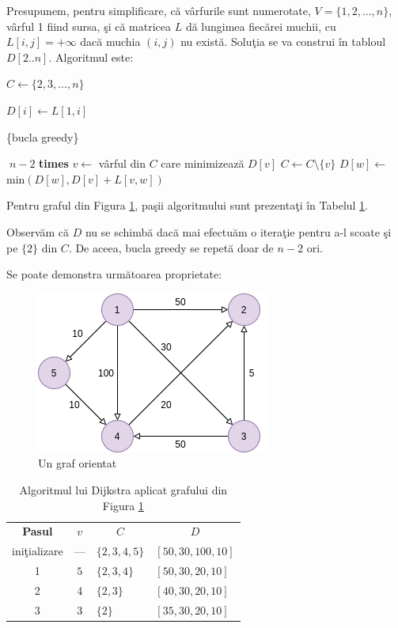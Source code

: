 \documentclass{article}
\begin{document}
Presupunem, pentru simplificare, că vârfurile sunt numerotate, $V=\{1, 2, \ldots, n\}$, vârful 1 fiind sursa, şi că matricea $L$ dă lungimea fiecărei muchii, cu $L[i,j] = +\infty$ dacă muchia $(i, j)$ nu există. Soluţia se va construi în tabloul $D[2 .. n]$. Algoritmul este:

\begin{algorithmic}
	\State {}
	\State $C \gets \{2, 3, \ldots, n\}$ \qquad {}


		\State $D[i] \gets L[1,i]$
	\EndFor

	\State \{bucla greedy\}

	\Repeat $\;n-2$ \textbf{times}
		\State $v \gets$ vârful din $C$ care minimizează $D[v]$
		\State $C \gets C \setminus \{v\}$ \qquad {}
			\State $D[w] \gets$ min$(D[w], D[v] + L[v,w])$
		\EndFor
	\Until{}
	\hspace{-.1cm}
\EndFunction
\end{algorithmic}

Pentru graful din Figura \ref{fig:graf}, paşii algoritmului sunt prezentaţi în Tabelul \ref{tbl:algo}.


Observăm că $D$ nu se schimbă dacă mai efectuăm o iteraţie pentru a-l scoate şi pe $\{2\}$ din $C$. De aceea, bucla greedy se repetă doar de $n-2$ ori.

Se poate demonstra următoarea proprietate:

\begin{figure}[htbp]
	\centering
	\includegraphics[scale=.7]{graf.png}

	\caption{Un graf orientat} \label{fig:graf}
\end{figure}

\begin{table}[htbp]
	\centering
	
	\begin{tabular}{c c l l}
		\textbf{Pasul} & $v$ & \multicolumn{1}{c}{$C$} & \multicolumn{1}{c}{$D$} \tabularnewline
		iniţializare & $—$ & $\{2,3,4,5\}$ & $[50,30,100,10]$\\
		1 & $5$ & $\{2,3,4\}$ & $[50,30,20,10]$\\
		2 & $4$ & $\{2,3\}$ & $[40,30,20,10]$\\
		3 & $3$ & $\{2\}$ & $[35,30,20,10]$\\
	\end{tabular}

	\caption{Algoritmul lui Dijkstra aplicat grafului din Figura \ref{fig:graf}} \label{tbl:algo}
\end{table}
\end{document}

